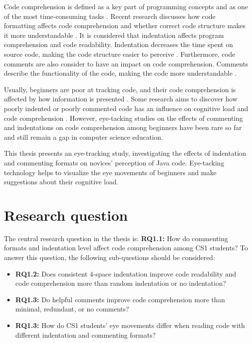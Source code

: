 Code comprehension is defined as a key part of programming concepts and as one of the most time-consuming tasks \cite{javier2021understanding}.
Recent research discusses how code formatting affects code comprehension and whether correct code structure makes it more understandable \cite{andrzejewska2020development}. It is considered that indentation affects program comprehension and code readability. Indentation decreases the time spent on source code, making the code structure easier to perceive \cite{bauer2017indentations}. Furthermore, code comments are also consider to have an impact on code comprehension. Comments describe the functionality of the code, making the code more understandable \cite{bakhuizen2019comments}.
 
Usually, beginners are poor at tracking code, and their code comprehension is affected by how information is presented \cite{robins2003learning}. Some research aims to discover how poorly indented or poorly commented code has an influence on cognitive load and code comprehension \cite{bauer2017indentations} \cite{yorimoto2024quantitative}.  However, eye-tacking studies on the effects of commenting and indentations on code comprehension among beginners have been rare so far and still remain a gap in computer science education.

  
This thesis presents an eye-tracking study, investigating the effects of indentation and commenting formats on novices’ perception of Java code. Eye-tacking technology helps to visualize the eye movements of beginners and make suggestions about their cognitive load. 


\section{Research question}

The central research question in the thesis is: \textbf{RQ1.1:} How do commenting formats and indentation level affect code comprehension among CS1 students? To answer this question, the following sub-questions should be considered:

\begin{itemize}
    \item \textbf{RQ1.2:} Does consistent 4-space indentation improve code readability and code comprehension more than random indentation or no indentation? 
    \item \textbf{RQ1.3:} Do helpful comments improve code comprehension more than minimal, redundant, or no comments?
    \item \textbf{RQ1.3:} How do CS1 students’ eye movements differ when reading code with different indentation and commenting formats?

\end{itemize}

